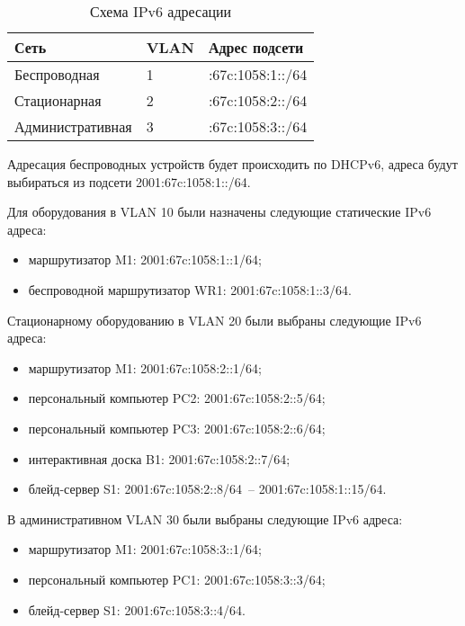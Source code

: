 \begin{table}[ht]
    \caption{Схема IPv6 адресации}
    \label{table:func:ipv6-addresation}
        \begin{tabular}{|>{\raggedright}m{}|>{\raggedright}m{}|>{\raggedright\arraybackslash}m{}|}
        \hline
        \centering Сеть \arraybackslash & \centering VLAN &\arraybackslash \centering Адрес подсети \arraybackslash\\
        \hline
        Беспроводная & 1  & 2001:67c:1058:1::/64\\
        \hline
        Стационарная & 2 & 2001:67c:1058:2::/64\\
        \hline
        Административная & 3 & 2001:67c:1058:3::/64\\
        \hline
    \end{tabular}
\end{table}

Адресация беспроводных устройств будет происходить по DHCPv6, адреса будут выбираться из подсети 2001:67c:1058:1::/64. 

Для оборудования в VLAN 10 были назначены следующие статические IPv6 адреса:
\begin{itemize}
    \item маршрутизатор M1: 2001:67c:1058:1::1/64;
    \item беспроводной маршрутизатор WR1: 2001:67c:1058:1::3/64.
\end{itemize}

Стационарному оборудованию в VLAN 20 были выбраны следующие IPv6 адреса:
\begin{itemize}
    \item маршрутизатор M1: 2001:67c:1058:2::1/64;
    \item персональный компьютер PC2: 2001:67c:1058:2::5/64;
    \item персональный компьютер PC3: 2001:67c:1058:2::6/64;
    \item интерактивная доска B1: 2001:67c:1058:2::7/64;
    \item блейд-сервер S1: 2001:67c:1058:2::8/64~-- 2001:67c:1058:1::15/64.
\end{itemize}

В административном VLAN 30 были выбраны следующие IPv6 адреса:
\begin{itemize}
    \item маршрутизатор M1: 2001:67c:1058:3::1/64;
    \item персональный компьютер PC1: 2001:67c:1058:3::3/64;
    \item блейд-сервер S1: 2001:67c:1058:3::4/64.
\end{itemize}

